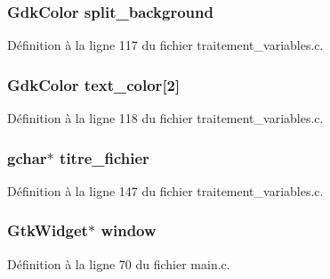 \subsubsection[{split\_\-background}]{\setlength{\rightskip}{0pt plus 5cm}GdkColor {\bf split\_\-background}}\label{affichage_8c_abc4f631d953e2be68189a6fbcf55cd1d}


Définition à la ligne 117 du fichier traitement\_\-variables.c.

\subsubsection[{text\_\-color}]{\setlength{\rightskip}{0pt plus 5cm}GdkColor {\bf text\_\-color}[2]}\label{affichage_8c_a8169600c05eb3674c1b11ca67dd677d3}


Définition à la ligne 118 du fichier traitement\_\-variables.c.

\subsubsection[{titre\_\-fichier}]{\setlength{\rightskip}{0pt plus 5cm}gchar$\ast$ {\bf titre\_\-fichier}}\label{affichage_8c_a787cc81cf2ad728775b73d723713980b}


Définition à la ligne 147 du fichier traitement\_\-variables.c.

\subsubsection[{window}]{\setlength{\rightskip}{0pt plus 5cm}GtkWidget$\ast$ {\bf window}}\label{affichage_8c_a3d346c08cf2d67c388caabffb412b293}


Définition à la ligne 70 du fichier main.c.


